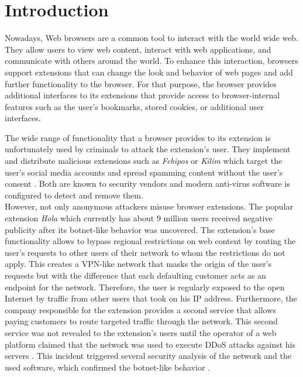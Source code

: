 
\chapter{Introduction}

	Nowadays, Web browsers are a common tool to interact with the world wide web. They allow users to view web content, interact with web applications, and communicate with others around the world. To enhance this interaction, browsers support extensions that can change the look and behavior of web pages and add further functionality to the browser. For that purpose, the browser provides additional interfaces to its extensions that provide access to browser-internal features such as the user's bookmarks, stored cookies, or additional user interfaces.
	
	The wide range of functionality that a browser provides to its extension is unfortunately used by criminals to attack the extension's user. They implement and distribute malicious extensions such as \textit{Febipos} or \textit{Kilim} which target the user's social media accounts and spread spamming content without the user's consent \cite{febipos, kilim}. Both are known to security vendors and modern anti-virus software is configured to detect and remove them. \\
	However, not only anonymous attackers misuse browser extensions. The popular extension \textit{Hola} which currently has about 9 million users received negative publicity after its botnet-like behavior was uncovered. The extension's base functionality allows to bypass regional restrictions on web content by routing the user's requests to other users of their network to whom the restrictions do not apply. This creates a VPN-like network that masks the origin of the user's requests but with the difference that each defaulting customer acts as an endpoint for the network. Therefore, the user is regularly exposed to the open Internet by traffic from other users that took on his IP address. Furthermore, the company responsible for the extension provides a second service that allows paying customers to route targeted traffic through the network. This second service was not revealed to the extension's users until the operator of a web platform claimed that the network was used to execute DDoS attacks against his servers \cite{holaFaqRewrite, 8chanHola}. This incident triggered several security analysis of the network and the used software, which confirmed the botnet-like behavior \cite{vectraHola}. \\
	
